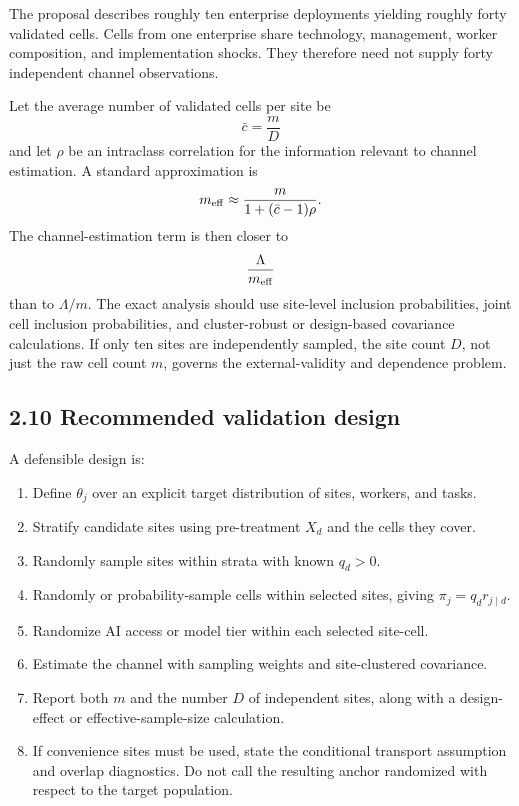 \documentclass[11pt]{article}
\begin{document}
The proposal describes roughly ten enterprise deployments yielding roughly
forty validated cells. Cells from one enterprise share technology, management,
worker composition, and implementation shocks. They therefore need not supply
forty independent channel observations.

Let the average number of validated cells per site be
\[
    \bar c=\frac mD
\]
and let \(\rho\) be an intraclass correlation for the information relevant to
channel estimation. A standard approximation is
\[
    m_{\rm eff}
    \approx
    \frac{m}{1+(\bar c-1)\rho}.
\]
The channel-estimation term is then closer to
\[
    \frac{\Lambda}{m_{\rm eff}}
\]
than to \(\Lambda/m\). The exact analysis should use site-level inclusion
probabilities, joint cell inclusion probabilities, and cluster-robust or
design-based covariance calculations. If only ten sites are independently
sampled, the site count \(D\), not just the raw cell count \(m\), governs the
external-validity and dependence problem.

\subsection*{2.10 Recommended validation design}

A defensible design is:
\begin{enumerate}[leftmargin=2em]
    \item Define \(\theta_j\) over an explicit target distribution of sites,
    workers, and tasks.
    \item Stratify candidate sites using pre-treatment \(X_d\) and the cells
    they cover.
    \item Randomly sample sites within strata with known \(q_d>0\).
    \item Randomly or probability-sample cells within selected sites, giving
    \(\pi_j=q_dr_{j\mid d}\).
    \item Randomize AI access or model tier within each selected site-cell.
    \item Estimate the channel with sampling weights and site-clustered
    covariance.
    \item Report both \(m\) and the number \(D\) of independent sites, along
    with a design-effect or effective-sample-size calculation.
    \item If convenience sites must be used, state the conditional transport
    assumption and overlap diagnostics. Do not call the resulting anchor
    randomized with respect to the target population.
\end{enumerate}
\end{document}
